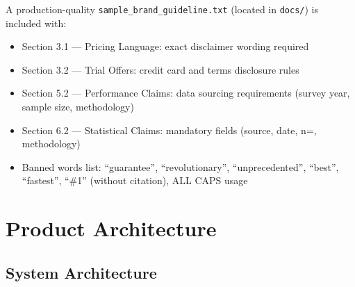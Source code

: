 \documentclass[11pt,a4paper]{article}
\begin{document}
A production-quality \texttt{sample\_brand\_guideline.txt} (located in \texttt{docs/}) is included with:
\begin{itemize}
    \item Section 3.1 --- Pricing Language: exact disclaimer wording required
    \item Section 3.2 --- Trial Offers: credit card and terms disclosure rules
    \item Section 5.2 --- Performance Claims: data sourcing requirements (survey year, sample size, methodology)
    \item Section 6.2 --- Statistical Claims: mandatory fields (source, date, n=, methodology)
    \item Banned words list: ``guarantee'', ``revolutionary'', ``unprecedented'', ``best'', ``fastest'', ``\#1'' (without citation), ALL CAPS usage
\end{itemize}

\section{Product Architecture}

\subsection{System Architecture}
\end{document}
